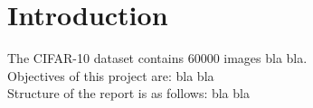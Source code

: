 \section{Introduction}
    \pagestyle{tom}
    
The CIFAR-10 dataset contains 60000 images bla bla.\\
Objectives of this project are: bla bla\\
Structure of the report is as follows: bla bla\\